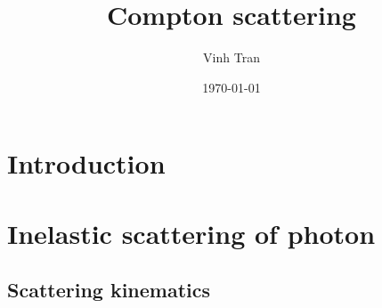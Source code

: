 \documentclass[aps,twocolumn,secnumarabic,balancelastpage,amsmath,amssymb,nofootinbib,floatfix]{revtex4-1}
\begin{document}
\title{Compton scattering}

\author{Vinh Tran}

\date{\today}


\begin{abstract}



\end{abstract}

\maketitle


\section{Introduction}
\label{sec:intro}




\section{Inelastic scattering of photon}
\label{sec:theory}

\subsection{Scattering kinematics}
\label{ssec:scattering_kinematics}
\end{document}
